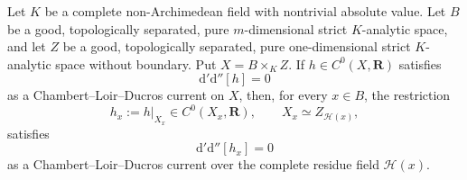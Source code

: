
\begin{proposition}\label{prop:p062-strict-product-fibre-slicing-v4-research}
Let \(K\) be a complete non-Archimedean field with nontrivial absolute
value.  Let \(B\) be a good, topologically separated, pure
\(m\)-dimensional strict \(K\)-analytic space, and let \(Z\) be a good,
topologically separated, pure one-dimensional strict \(K\)-analytic space
without boundary.  Put \(X=B\times_K Z\).  If
\(h\in C^0(X,\mathbf R)\) satisfies
\begin{equation}\label{eq:p062-general-product-zero-current-v4-research}
                    \mathrm d'\mathrm d''[h]=0
\end{equation}
as a Chambert--Loir--Ducros current on \(X\), then, for every \(x\in B\),
the restriction
\[
       h_x:=h|_{X_x}\in C^0(X_x,\mathbf R),
       \qquad X_x\simeq Z_{\mathscr H(x)},
\]
satisfies
\begin{equation}\label{eq:p062-general-fibre-zero-current-v4-research}
                  \mathrm d'\mathrm d''[h_x]=0
\end{equation}
as a Chambert--Loir--Ducros current over the complete residue field
\(\mathscr H(x)\).
\end{proposition}

